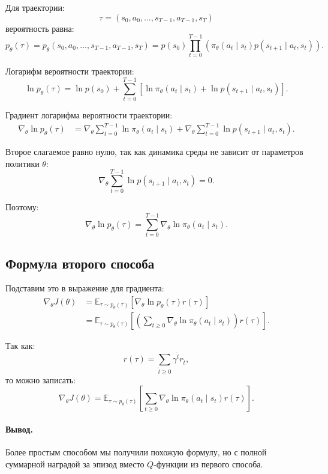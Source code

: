 \documentclass[12pt,a4paper]{article}
\begin{document}
Для траектории:
\[
\tau=(s_0,a_0,\ldots,s_{T-1},a_{T-1},s_T)
\]
вероятность равна:
\[
p_\theta(\tau)
=
p_\theta(s_0,a_0,\ldots,s_{T-1},a_{T-1},s_T)
=
p(s_0)
\prod_{t=0}^{T-1}
\left(
\pi_\theta(a_t\mid s_t)
p(s_{t+1}\mid a_t,s_t)
\right).
\]

Логарифм вероятности траектории:
\[
\ln p_\theta(\tau)
=
\ln p(s_0)
+
\sum_{t=0}^{T-1}
\left[
\ln \pi_\theta(a_t\mid s_t)
+
\ln p(s_{t+1}\mid a_t,s_t)
\right].
\]

Градиент логарифма вероятности траектории:
\[
\begin{aligned}
\nabla_\theta
\ln p_\theta(\tau)
&=
\nabla_\theta
\sum_{t=0}^{T-1}
\ln \pi_\theta(a_t\mid s_t)
+
\nabla_\theta
\sum_{t=0}^{T-1}
\ln p(s_{t+1}\mid a_t,s_t).
\end{aligned}
\]

Второе слагаемое равно нулю, так как динамика среды не зависит от параметров политики $\theta$:
\[
\nabla_\theta
\sum_{t=0}^{T-1}
\ln p(s_{t+1}\mid a_t,s_t)
=
0.
\]

Поэтому:
\[
\nabla_\theta
\ln p_\theta(\tau)
=
\sum_{t=0}^{T-1}
\nabla_\theta
\ln \pi_\theta(a_t\mid s_t).
\]

\subsection{Формула второго способа}

Подставим это в выражение для градиента:
\[
\begin{aligned}
\nabla_\theta J(\theta)
&=
\mathbb E_{\tau\sim p_\theta(\tau)}
\left[
\nabla_\theta
\ln p_\theta(\tau)
r(\tau)
\right]
\\
&=
\mathbb E_{\tau\sim p_\theta(\tau)}
\left[
\left(
\sum_{t\ge 0}
\nabla_\theta
\ln \pi_\theta(a_t\mid s_t)
\right)
r(\tau)
\right].
\end{aligned}
\]

Так как:
\[
r(\tau)
=
\sum_{\hat t\ge 0}
\gamma^{\hat t} r_{\hat t},
\]
то можно записать:
\[
\nabla_\theta J(\theta)
=
\mathbb E_{\tau\sim p_\theta(\tau)}
\left[
\sum_{t\ge 0}
\nabla_\theta
\ln \pi_\theta(a_t\mid s_t)
r(\tau)
\right].
\]

\paragraph{Вывод.}

Более простым способом мы получили похожую формулу, но с полной суммарной наградой за эпизод вместо $Q$-функции из первого способа.
\end{document}
